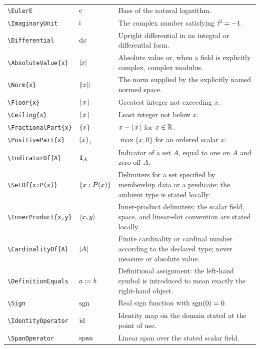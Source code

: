 \documentclass[11pt,oneside]{article}
\theoremstyle{definition}
\theoremstyle{remark}
\DeclareRobustCommand{\commandname}[1]{\texttt{\textbackslash#1}}
\begin{document}
\begin{longtable}{@{}S{0.35\textwidth}L{0.14\textwidth}L{0.45\textwidth}@{}}
\commandname{EulerE} & $\mathrm{e}$ & Base of the natural logarithm.\\
\commandname{ImaginaryUnit} & $\mathrm{i}$ & The complex number satisfying
$\mathrm{i}^2=-1$.\\
\commandname{Differential} & $\mathop{}\!\mathrm{d} x$ & Upright differential in an integral or
differential form.\\
\commandname{AbsoluteValue}\texttt{\{x\}} & $\left\lvert x\right\rvert$ & Absolute value or,
when a field is explicitly complex, complex modulus.\\
\commandname{Norm}\texttt{\{x\}} & $\left\lVert x\right\rVert$ & The norm supplied by the explicitly
named normed space.\\
\commandname{Floor}\texttt{\{x\}} & $\left\lfloor x\right\rfloor$ & Greatest integer not exceeding $x$.\\
\commandname{Ceiling}\texttt{\{x\}} & $\left\lceil x\right\rceil$ & Least integer not below $x$.\\
\commandname{FractionalPart}\texttt{\{x\}} & $\left\{x\right\}$ & $x-\left\lfloor x\right\rfloor$ for
$x\in\mathbb{R}$.\\
\commandname{PositivePart}\texttt{\{x\}} & $\left(x\right)_{+}$ & $\max\{x,0\}$ for
an ordered scalar $x$.\\
\commandname{IndicatorOf}\texttt{\{A\}} & $\mathbf{1}_{A}$ & Indicator of a set $A$,
equal to one on $A$ and zero off $A$.\\
\commandname{SetOf}\texttt{\{x:P(x)\}} & $\left\{x:P(x)\right\}$ & Delimiters for a set
specified by membership data or a predicate; the ambient type is stated locally.\\
\commandname{InnerProduct}\texttt{\{x,y\}} & $\left\langle x,y\right\rangle$ & Inner-product
delimiters; the scalar field, space, and linear-slot convention are stated locally.\\
\commandname{CardinalityOf}\texttt{\{A\}} & $\left\lvert A\right\rvert$ & Finite cardinality
or cardinal number according to the declared type; never measure or absolute value.\\
\commandname{DefinitionEquals} & $a\mathrel{\coloneqq} b$ & Definitional assignment:
the left-hand symbol is introduced to mean exactly the right-hand object.\\
\commandname{Sign} & $\operatorname{sgn}$ & Real sign function with $\operatorname{sgn}(0)=0$.\\
\commandname{IdentityOperator} & $\operatorname{id}$ & Identity map on the domain stated
at the point of use.\\
\commandname{SpanOperator} & $\operatorname{span}$ & Linear span over the stated scalar field.\\

\end{longtable}
\end{document}

